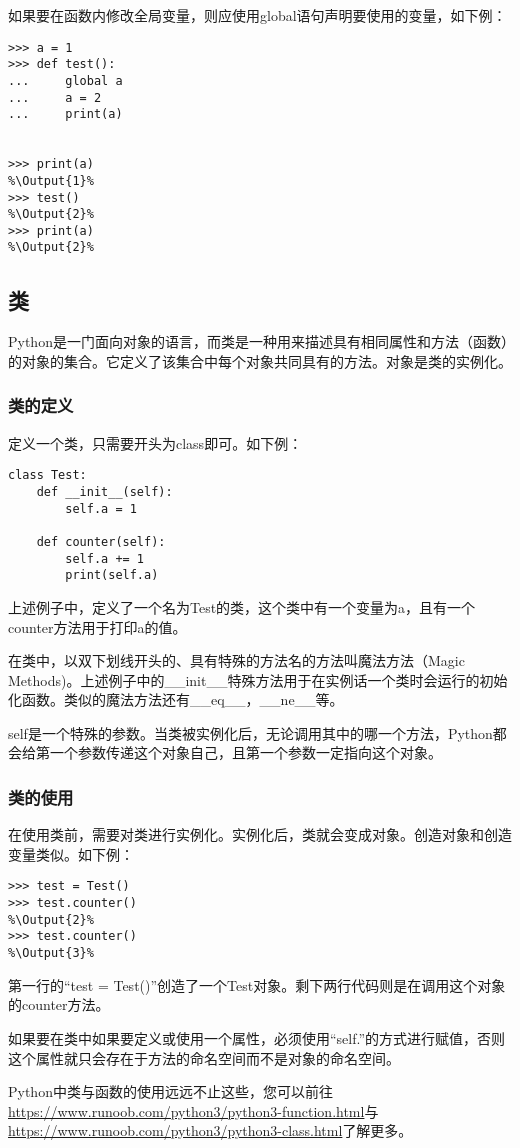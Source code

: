 如果要在函数内修改全局变量，则应使用global语句声明要使用的变量，如下例：
\begin{lstlisting}
>>> a = 1
>>> def test():
...     global a
...     a = 2
...     print(a)


>>> print(a)
%\Output{1}%
>>> test()
%\Output{2}%
>>> print(a)
%\Output{2}%
\end{lstlisting}

\subsection{类}
Python是一门面向对象的语言，而类是一种用来描述具有相同属性和方法（函数）的对象的集合。它定义了该集合中每个对象共同具有的方法。对象是类的实例化。

\subsubsection{类的定义}
定义一个类，只需要开头为class即可。如下例：

\begin{lstlisting}
class Test:
    def __init__(self):
        self.a = 1

    def counter(self):
        self.a += 1
        print(self.a)
\end{lstlisting}

上述例子中，定义了一个名为Test的类，这个类中有一个变量为a，且有一个counter方法用于打印a的值。
\begin{ExtraKnowledge}
    在类中，以双下划线开头的、具有特殊的方法名的方法叫魔法方法（Magic Methods)。上述例子中的\_\_init\_\_特殊方法用于在实例话一个类时会运行的初始化函数。类似的魔法方法还有\_\_eq\_\_，\_\_ne\_\_等。

    self是一个特殊的参数。当类被实例化后，无论调用其中的哪一个方法，Python都会给第一个参数传递这个对象自己，且第一个参数一定指向这个对象。
\end{ExtraKnowledge}

\subsubsection{类的使用}
在使用类前，需要对类进行实例化。实例化后，类就会变成对象。创造对象和创造变量类似。如下例：

\begin{lstlisting}
>>> test = Test()
>>> test.counter()
%\Output{2}%
>>> test.counter()
%\Output{3}%
\end{lstlisting}

第一行的“test = Test()”创造了一个Test对象。剩下两行代码则是在调用这个对象的counter方法。

如果要在类中如果要定义或使用一个属性，必须使用“self.”的方式进行赋值，否则这个属性就只会存在于方法的命名空间而不是对象的命名空间。

\begin{ExtraKnowledge}
    Python中类与函数的使用远远不止这些，您可以前往\url{https://www.runoob.com/python3/python3-function.html}与\url{https://www.runoob.com/python3/python3-class.html}了解更多。
\end{ExtraKnowledge}
